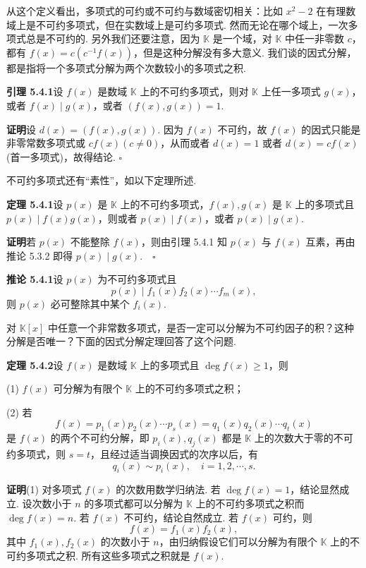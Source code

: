 \documentclass[UTF8,12pt,a4paper,fontset=fandol]{ctexart}
\begin{document}
从这个定义看出，多项式的可约或不可约与数域密切相关：比如 $x^2-2$ 在有理数域上是不可约多项式，但在实数域上是可约多项式. 然而无论在哪个域上，一次多项式总是不可约的. 另外我们还要注意，因为 $\mathbb{K}$ 是一个域，对 $\mathbb{K}$ 中任一非零数 $c$，都有 $f(x)=c(c^{-1}f(x))$，但是这种分解没有多大意义. 我们谈的因式分解，都是指将一个多项式分解为两个次数较小的多项式之积.

\noindent\textbf{引理 5.4.1}\quad 设 $f(x)$ 是数域 $\mathbb{K}$ 上的不可约多项式，则对 $\mathbb{K}$ 上任一多项式 $g(x)$，或者 $f(x)\mid g(x)$，或者 $(f(x),g(x))=1$.

\noindent\textbf{证明}\quad 设 $d(x)=(f(x),g(x))$. 因为 $f(x)$ 不可约，故 $f(x)$ 的因式只能是非零常数多项式或 $cf(x)(c\neq 0)$，从而或者 $d(x)=1$ 或者 $d(x)=cf(x)$ (首一多项式)，故得结论. $\square$

不可约多项式还有“素性”，如以下定理所述.

\noindent\textbf{定理 5.4.1}\quad 设 $p(x)$ 是 $\mathbb{K}$ 上的不可约多项式，$f(x),g(x)$ 是 $\mathbb{K}$ 上的多项式且 $p(x)\mid f(x)g(x)$，则或者 $p(x)\mid f(x)$，或者 $p(x)\mid g(x)$.

\noindent\textbf{证明}\quad 若 $p(x)$ 不能整除 $f(x)$，则由引理 5.4.1 知 $p(x)$ 与 $f(x)$ 互素，再由推论 5.3.2 即得 $p(x)\mid g(x).\quad \square$

\noindent\textbf{推论 5.4.1}\quad 设 $p(x)$ 为不可约多项式且
\[
p(x)\mid f_1(x)f_2(x)\cdots f_m(x),
\]
则 $p(x)$ 必可整除其中某个 $f_i(x)$.

对 $\mathbb{K}[x]$ 中任意一个非常数多项式，是否一定可以分解为不可约因子的积？这种分解是否唯一？下面的因式分解定理回答了这个问题.

\noindent\textbf{定理 5.4.2}\quad 设 $f(x)$ 是数域 $\mathbb{K}$ 上的多项式且 $\deg f(x)\geq 1$，则

(1) $f(x)$ 可分解为有限个 $\mathbb{K}$ 上的不可约多项式之积；

(2) 若
\begin{equation}
f(x)=p_1(x)p_2(x)\cdots p_s(x)=q_1(x)q_2(x)\cdots q_t(x)
\tag{5.4.1}
\end{equation}
是 $f(x)$ 的两个不可约分解，即 $p_i(x),q_j(x)$ 都是 $\mathbb{K}$ 上的次数大于零的不可约多项式，则 $s=t$，且经过适当调换因式的次序以后，有
\[
q_i(x)\sim p_i(x),\quad i=1,2,\cdots,s.
\]

\noindent\textbf{证明}\quad (1) 对多项式 $f(x)$ 的次数用数学归纳法. 若 $\deg f(x)=1$，结论显然成立. 设次数小于 $n$ 的多项式都可以分解为 $\mathbb{K}$ 上的不可约多项式之积而 $\deg f(x)=n$. 若 $f(x)$ 不可约，结论自然成立. 若 $f(x)$ 可约，则
\[
f(x)=f_1(x)f_2(x),
\]
其中 $f_1(x),f_2(x)$ 的次数小于 $n$，由归纳假设它们可以分解为有限个 $\mathbb{K}$ 上的不可约多项式之积. 所有这些多项式之积就是 $f(x)$.
\end{document}
